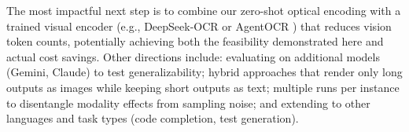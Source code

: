 The most impactful next step is to combine our zero-shot optical encoding with a trained visual encoder (e.g., DeepSeek-OCR \cite{wei2025deepseekocr} or AgentOCR \cite{feng2026agentocr}) that reduces vision token counts, potentially achieving both the feasibility demonstrated here and actual cost savings. Other directions include: evaluating on additional models (Gemini, Claude) to test generalizability; hybrid approaches that render only long outputs as images while keeping short outputs as text; multiple runs per instance to disentangle modality effects from sampling noise; and extending to other languages and task types (code completion, test generation).
